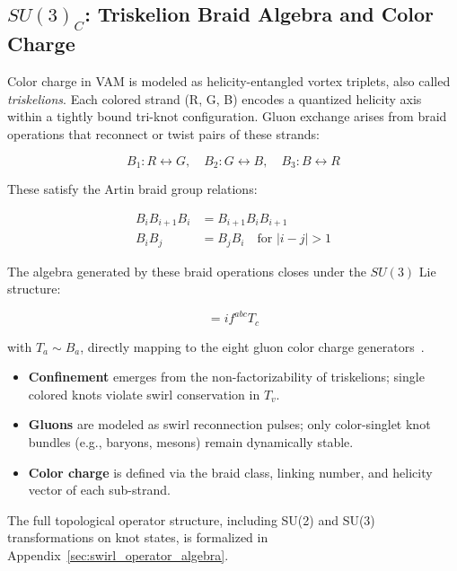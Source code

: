 \documentclass[preprint]{revtex4-2}
\begin{document}
    \subsection{\textbf{\boldmath\texorpdfstring{$SU(3)_C$}{SU(3)C}}: Triskelion Braid Algebra and Color Charge}
    Color charge in VAM is modeled as helicity-entangled vortex triplets, also called \emph{triskelions}. Each colored strand (R, G, B) encodes a quantized helicity axis within a tightly bound tri-knot configuration. Gluon exchange arises from braid operations that reconnect or twist pairs of these strands:

    \begin{equation}
    B_1: R \leftrightarrow G, \quad B_2: G \leftrightarrow B, \quad B_3: B \leftrightarrow R
    \end{equation}

    These satisfy the Artin braid group relations:

    \begin{align}
    B_i B_{i+1} B_i &= B_{i+1} B_i B_{i+1} \\
    B_i B_j &= B_j B_i \quad \text{for } |i - j| > 1
    \end{align}

    The algebra generated by these braid operations closes under the \( SU(3) \) Lie structure:

    \begin{equation}
    [T_a, T_b] = i f^{abc} T_c
    \end{equation}

    with \( T_a \sim B_a \), directly mapping to the eight gluon color charge generators~\cite{kleckner2013creation}.

    \begin{itemize}
        \item \textbf{Confinement} emerges from the non-factorizability of triskelions; single colored knots violate swirl conservation in \( T_v \).
        \item \textbf{Gluons} are modeled as swirl reconnection pulses; only color-singlet knot bundles (e.g., baryons, mesons) remain dynamically stable.
        \item \textbf{Color charge} is defined via the braid class, linking number, and helicity vector of each sub-strand.
    \end{itemize}
    The full topological operator structure, including SU(2) and SU(3) transformations on knot states, is formalized in Appendix~\ref{sec:swirl_operator_algebra}.
\end{document}
